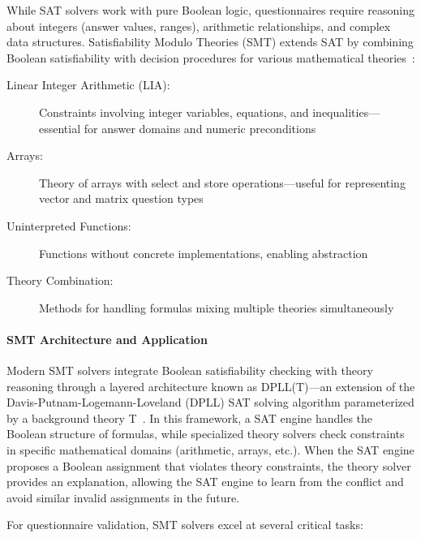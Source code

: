 While SAT solvers work with pure Boolean logic, questionnaires require reasoning about integers (answer values, ranges), arithmetic relationships, and complex data structures. Satisfiability Modulo Theories (SMT) extends SAT by combining Boolean satisfiability with decision procedures for various mathematical theories~\cite{biere2009handbook, demoura2008z3}:

\begin{description}
    \item[Linear Integer Arithmetic (LIA):] Constraints involving integer variables, equations, and inequalities—essential for answer domains and numeric preconditions   
    \item[Arrays:] Theory of arrays with select and store operations—useful for representing vector and matrix question types
    \item[Uninterpreted Functions:] Functions without concrete implementations, enabling abstraction
    \item[Theory Combination:] Methods for handling formulas mixing multiple theories simultaneously
\end{description}

\paragraph{SMT Architecture and Application}

Modern SMT solvers integrate Boolean satisfiability checking with theory reasoning through a layered architecture known as DPLL(T)—an extension of the Davis-Putnam-Logemann-Loveland (DPLL) SAT solving algorithm parameterized by a background theory T~\cite{nieuwenhuis2006solving}. In this framework, a SAT engine handles the Boolean structure of formulas, while specialized theory solvers check constraints in specific mathematical domains (arithmetic, arrays, etc.). When the SAT engine proposes a Boolean assignment that violates theory constraints, the theory solver provides an explanation, allowing the SAT engine to learn from the conflict and avoid similar invalid assignments in the future.

For questionnaire validation, SMT solvers excel at several critical tasks:

